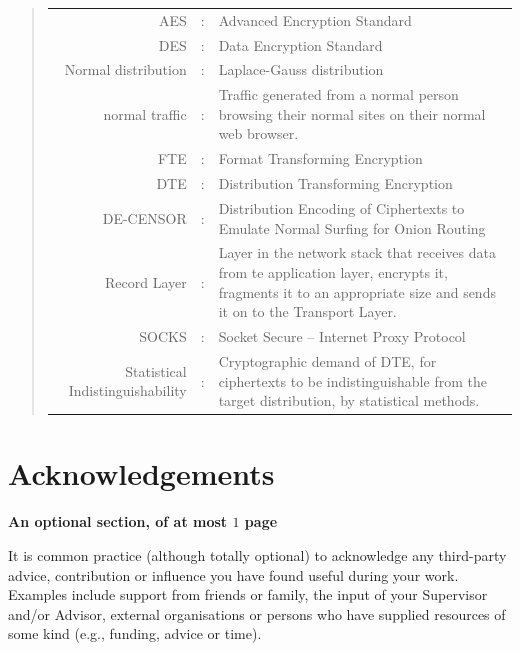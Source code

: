 \documentclass[ %
                    author={Samuel Russell},
                supervisor={Prof. Bogdan Warinschi},
                    degree={MEng},
                     title={Innocuous Ciphertexts},
                  subtitle={The DE-CENSOR Scheme},
                      type={research},
                      year={2018} ]{dissertation}
\begin{document}
\begin{quote}
\noindent
\begin{tabularx}{\textwidth}{ r c X }
AES                 &:		& Advanced Encryption Standard                                         \\
DES                 &:		& Data Encryption Standard                                             \\
Normal distribution &:		& Laplace-Gauss distribution
\\
normal traffic		&:		& Traffic generated from a normal person
browsing their normal sites on their normal web browser.\\
FTE					&:		& Format Transforming Encryption\\
DTE					&:		& Distribution Transforming Encryption\\
DE-CENSOR			&:		& Distribution Encoding of Ciphertexts to Emulate Normal Surfing for Onion Routing\\
Record Layer		&:		& Layer in the network stack that receives data from te application layer, encrypts it, fragments it to an appropriate size and sends it on to the Transport Layer.\\
SOCKS				&:		& Socket Secure -- Internet Proxy Protocol\\
Statistical Indistinguishability&:& Cryptographic demand of DTE, for ciphertexts to be indistinguishable from the target distribution, by statistical methods.\\

\end{tabularx}
\end{quote}


\chapter*{Acknowledgements}

{\bf An optional section, of at most $1$ page}
\vspace{1cm} 

\noindent
It is common practice (although totally optional) to acknowledge any
third-party advice, contribution or influence you have found useful
during your work.  Examples include support from friends or family, 
the input of your Supervisor and/or Advisor, external organisations 
or persons who  have supplied resources of some kind (e.g., funding, 
advice or time).
\end{document}
